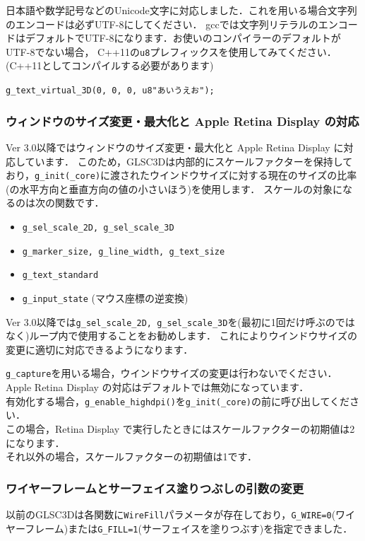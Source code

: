 \documentclass[platex,a4paper,12pt]{jsarticle}%
\begin{document}
日本語や数学記号などのUnicode文字に対応しました．これを用いる場合文字列のエンコードは必ずUTF-8にしてください．
gccでは文字列リテラルのエンコードはデフォルトでUTF-8になります．お使いのコンパイラーのデフォルトがUTF-8でない場合，
C++11の\verb|u8|プレフィックスを使用してみてください．(C++11としてコンパイルする必要があります)
\begin{center}
\verb|g_text_virtual_3D(0, 0, 0, u8"あいうえお");|
\end{center}

\subsubsection{ウィンドウのサイズ変更・最大化と Apple Retina Display の対応}
Ver 3.0以降ではウィンドウのサイズ変更・最大化と Apple Retina Display に対応しています．
このため，GLSC3Dは内部的にスケールファクターを保持しており，\verb|g_init(_core)|に渡されたウインドウサイズに対する現在のサイズの比率(の水平方向と垂直方向の値の小さいほう)を使用します．
スケールの対象になるのは次の関数です．
\begin{itemize}
	\item \verb|g_sel_scale_2D, g_sel_scale_3D|
	\item \verb|g_marker_size, g_line_width, g_text_size|
	\item \verb|g_text_standard|
	\item \verb|g_input_state| (マウス座標の逆変換)
\end{itemize}
Ver 3.0以降では\verb|g_sel_scale_2D, g_sel_scale_3D|を(最初に1回だけ呼ぶのではなく)ループ内で使用することをお勧めします．
これによりウインドウサイズの変更に適切に対応できるようになります．

\verb|g_capture|を用いる場合，ウインドウサイズの変更は行わないでください．\\

Apple Retina Display の対応はデフォルトでは無効になっています．\\
有効化する場合，\verb|g_enable_highdpi()|を\verb|g_init(_core)|の前に呼び出してください．\\
この場合，Retina Display で実行したときにはスケールファクターの初期値は2になります．\\
それ以外の場合，スケールファクターの初期値は1です．

\subsubsection{ワイヤーフレームとサーフェイス塗りつぶしの引数の変更}
以前のGLSC3Dは各関数に\verb|WireFill|パラメータが存在しており，\verb|G_WIRE=0|(ワイヤーフレーム)または\verb|G_FILL=1|(サーフェイスを塗りつぶす)を指定できました．
\end{document}
